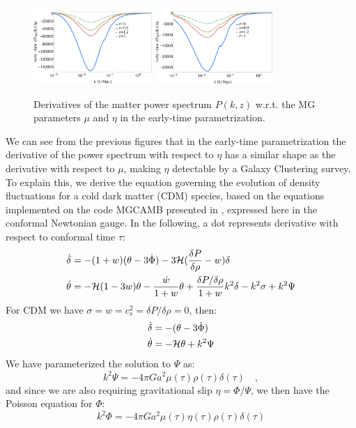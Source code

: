 \begin{figure}[htbp]
	\centering{}
	\includegraphics[width=0.4\textwidth]{Chapters/linear-nonlinear-MG-forecasts/figures/power-spectra/derivs/MGTR-Pk-wrt-mu-4z.pdf}
	\includegraphics[width=0.4\textwidth]{Chapters/linear-nonlinear-MG-forecasts/figures/power-spectra/derivs/MGTR-Pk-wrt-eta-4z.pdf}
	\caption[Derivatives of the power spectrum in the early-time parameterization.]
	{ Derivatives of the matter power spectrum $P(k,z)$ w.r.t. the MG parameters $\mu$ and $\eta$ in the early-time parametrization.
	}\label{fig:Pkderivs-latetime}
\end{figure}

We can see from the previous figures that in the early-time parametrization the derivative of the power spectrum
with respect to $\eta$ has a similar shape as the derivative with respect to $\mu$, making $\eta$ detectable by a Galaxy Clustering survey.
To explain this, we derive the equation governing the evolution of density fluctuations for a cold dark matter (CDM) species, based on the equations
implemented on the code MGCAMB presented in \cite{hojjati_testing_2011}, expressed here in the conformal Newtonian gauge.
In the following, a dot represents derivative with respect to conformal time $\tau$:
\begin{align}
\dot \delta &= - (1+w)(\theta - 3 \dot \Phi) - 3 \mathcal{H}(\frac{\delta P}{\delta \rho}-w)\delta\\
\dot \theta &= - \mathcal{H} (1-3w)\theta - \frac{\dot w}{1+w} \theta + \frac{\delta P / \delta \rho}{1+w} k^2 \delta - k^2 \sigma + k^2 \Psi
\end{align}
For CDM we have $\sigma = w = c^2_s= \delta P / \delta \rho  = 0$,  then:
\begin{align}
\dot \delta &= -(\theta - 3 \dot \Phi) \label{eq:deltadot}\\
\dot \theta &= -\mathcal{H} \theta + k^2 \Psi \label{eq:thetadot}
\end{align}
We have parameterized the solution to $\Psi$ as:
\begin{equation}\label{eq:Psipoisson}
k^2 \Psi = -4 \pi G a^2 \mu(\tau) \rho(\tau) \delta(\tau) \quad ,
\end{equation}
and since we are also requiring gravitational slip $\eta = \Phi / \Psi$, we then have the Poisson equation for $\Phi$:
\begin{equation}
k^2 \Phi = -4 \pi G a^2 \mu(\tau) \eta(\tau) \rho(\tau) \delta(\tau) \label{eq:Phipoisson}
\end{equation}

